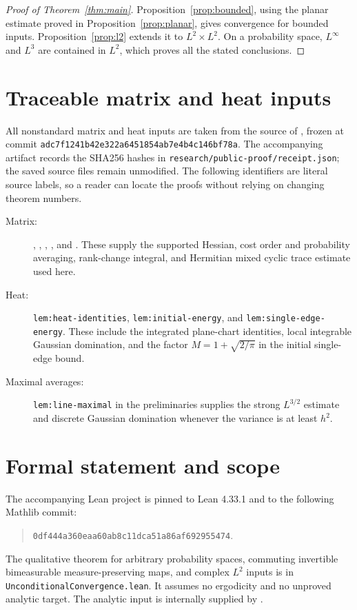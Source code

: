 \documentclass[11pt,a4paper]{article}
\theoremstyle{definition}
\newcommand{\1}{\mathbf1}
\begin{document}
\begin{proof}[Proof of Theorem~\ref{thm:main}]
Proposition~\ref{prop:bounded}, using the planar estimate proved in
Proposition~\ref{prop:planar}, gives convergence for bounded inputs.
Proposition~\ref{prop:l2} extends it to
$L^2\times L^2$. On a probability space, $L^\infty$ and $L^3$ are
contained in $L^2$, which proves all the stated conclusions.
\end{proof}


\appendix
\section{Traceable matrix and heat inputs}\label{app:inputs}
All nonstandard matrix and heat inputs are taken from the source of
\cite{FrozenMatrix,FrozenHeat,FrozenPreliminaries}, frozen at commit
\texttt{adc7f1241b42e322a6451854ab7e4b4c146bf78a}.
The accompanying artifact records the SHA256 hashes in
\texttt{research/public-proof/receipt.json}; the saved source files
remain unmodified. The following identifiers are literal source labels,
so a reader can locate the proofs without relying on changing theorem
numbers.
\begin{description}
\item[Matrix:] , ,
, , and
. These supply the supported Hessian, cost
order and probability averaging, rank-change integral, and Hermitian
mixed cyclic trace estimate used here.
\item[Heat:] \texttt{lem:heat-identities},
\texttt{lem:initial-energy}, and \texttt{lem:single-edge-energy}.
These include the integrated plane-chart identities, local integrable
Gaussian domination, and the factor $M=1+\sqrt{2/\pi}$ in the initial
single-edge bound.
\item[Maximal averages:] \texttt{lem:line-maximal} in the
preliminaries supplies the strong $L^{3/2}$ estimate and discrete
Gaussian domination whenever the variance is at least $h^2$.
\end{description}

\section{Formal statement and scope}\label{app:formal}
The accompanying Lean project is pinned to Lean 4.33.1 and to the following
Mathlib commit:
\begin{quote}
\texttt{0df444a360eaa60ab8c11dca51a86af692955474}.
\end{quote}
The qualitative theorem for arbitrary probability spaces, commuting
invertible bimeasurable measure-preserving maps, and complex $L^2$
inputs is  in
\texttt{UnconditionalConvergence.lean}. It assumes no ergodicity and
no unproved analytic target. The analytic input is internally supplied
by .
\end{document}
